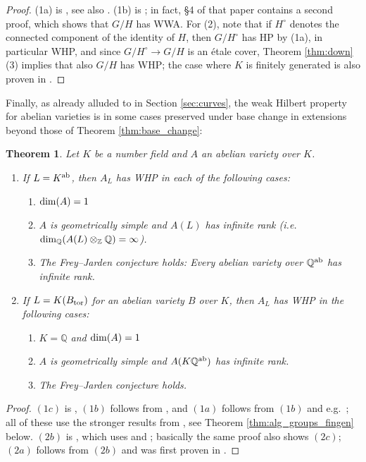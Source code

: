\documentclass[10pt,a4paper]{amsart}
\theoremstyle{plain}
\newtheorem{theorem}{Theorem}
\theoremstyle{remark}
\numberwithin{theorem}{section}
\begin{document}
\begin{proof}
(1a) is \cite[Corollary 4.6]{BFP}, see also \cite[Proposition 1.1]{Borovoi}.
(1b) is \cite[Theorem 1.2]{Borovoi}; in fact, \S4 of that paper contains a second proof, which shows that $G/H$ has WWA.
For (2), note that if $H^\circ$ denotes the connected component of the identity of $H$, then $G/H^\circ$ has HP by (1a), in particular WHP,
and since $G/H^\circ\rightarrow G/H$ is an \'etale cover,
Theorem \ref{thm:down}(3) implies that also $G/H$ has WHP;
the case where $K$ is finitely generated is also proven in
\cite[Theorem 1.8]{Liu}.
\end{proof}

Finally, as already alluded to in Section \ref{sec:curves}, 
the weak Hilbert property for abelian varieties is in some cases preserved under base change in extensions beyond those of Theorem \ref{thm:base_change}: 

\begin{theorem}\label{thm:bfp}   
Let $K$ be a number field and $A$ an abelian variety over $K$.
\begin{enumerate}
    \item If $L=K^{\rm ab}$, then $A_{L}$ has WHP in each of the following cases:
    \begin{enumerate}[$(a)$]
     \item ${\rm dim}(A)=1$
     \item $A$ is geometrically simple and $A(L)$
    has infinite rank (i.e.~${\rm dim}_\mathbb{Q}(A(L)\otimes_\mathbb{Z}\mathbb{Q})=\infty$).
    \item The Frey--Jarden conjecture holds: Every abelian variety over $\mathbb{Q}^{\rm ab}$ has infinite rank.
    \end{enumerate}
    \item If $L=K(B_{\rm tor})$ for an abelian variety $B$ over $K$, then $A_L$ has WHP in the following cases:
    \begin{enumerate}[$(a)$]
       \item $K=\mathbb{Q}$ and ${\rm dim}(A)=1$ 
       \item $A$ is geometrically simple and $A(K\mathbb{Q}^{\rm ab})$
    has infinite rank.
       \item The Frey--Jarden conjecture holds.
    \end{enumerate}
\end{enumerate}
\end{theorem}

\begin{proof}
$(1c)$ is \cite[Corollary 1.5]{BFP23}, 
$(1b)$ follows from \cite[Theorem~1.4]{BFP23},
and $(1a)$ follows from $(1b)$ and e.g.~\cite[Theorem 1.1]{Petersen};
all of these use the stronger results from \cite{CDJLZ}, 
see Theorem \ref{thm:alg_groups_fingen} below.
$(2b)$ is \cite[Theorem 5.1]{GP},
which uses \cite{BFP23} and \cite{BFP24};
basically the same proof also shows $(2c)$;
$(2a)$ follows from $(2b)$ and was first proven in \cite[Theorem 1.7]{BFP23}.
\end{proof}
\end{document}
